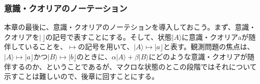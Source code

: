 \subsubsection{意識・クオリアのノーテーション}
本章の最後に、意識・クオリアのノーテションを導入しておこう。まず、意識・クオリアを$|\,\rfloor$の記号で表すことにする。そして、状態$|A\rangle$に意識・クオリアaが随伴していることを、$\mapsto$の記号を用いて、$|A\rangle \mapsto |a \rfloor$と表す。観測問題の焦点は、$|A\rangle \mapsto |a \rfloor$かつ$|B\rangle \mapsto |b \rfloor$のときに、$\alpha|A\rangle + \beta|B\rangle$にどのような意識・クオリアが随伴するのか、ということであるが、マクロな状態のとこの段階ではそれについて示すことは難しいので、後章に回すことにする。
